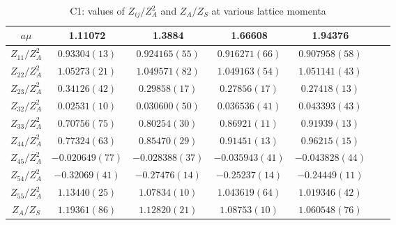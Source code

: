 \begin{table}
\begin{center}
\caption{\label{tab:C1renormvals}C1: values of $Z_{ij}/Z_A^2$ and $Z_A/Z_S$ at various lattice momenta}
\begin{tabular}{c|c c c c c c}
\hline
\hline
$a\mu$ & 1.11072 & 1.3884 & 1.66608 & 1.94376 \\
\hline
$Z_{11}/Z_A^2$ & $0.93304(13)$ & $0.924165(55)$ & $0.916271(66)$ & $0.907958(58)$ \\
\hline
$Z_{22}/Z_A^2$ & $1.05273(21)$ & $1.049571(82)$ & $1.049163(54)$ & $1.051141(43)$ \\
$Z_{23}/Z_A^2$ & $0.34126(42)$ & $0.29858(17)$ & $0.27856(17)$ & $0.27418(13)$ \\
$Z_{32}/Z_A^2$ & $0.02531(10)$ & $0.030600(50)$ & $0.036536(41)$ & $0.043393(43)$ \\
$Z_{33}/Z_A^2$ & $0.70756(75)$ & $0.80254(30)$ & $0.86921(11)$ & $0.91939(13)$ \\
\hline
$Z_{44}/Z_A^2$ & $0.77324(63)$ & $0.85470(29)$ & $0.91451(13)$ & $0.96215(15)$ \\
$Z_{45}/Z_A^2$ & $-0.020649(77)$ & $-0.028388(37)$ & $-0.035943(41)$ & $-0.043828(44)$ \\
$Z_{54}/Z_A^2$ & $-0.32069(41)$ & $-0.27476(14)$ & $-0.25237(14)$ & $-0.24449(11)$ \\
$Z_{55}/Z_A^2$ & $1.13440(25)$ & $1.07834(10)$ & $1.043619(64)$ & $1.019346(42)$ \\
\hline
$Z_A/Z_S$ & $1.19361(86)$ & $1.12820(21)$ & $1.08753(10)$ & $1.060548(76)$ \\
\hline
\hline
\end{tabular}
\end{center}
\end{table}